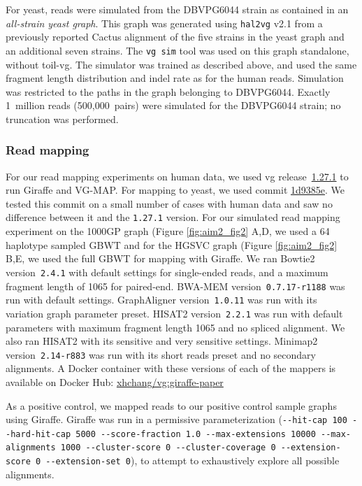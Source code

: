 \documentclass[11pt]{ucscthesis}
\newcommand{\vgcommit}[2]{\href{https://github.com/vgteam/vg/commit/#1}{#2}}
\newcommand{\vocab}[1]{\emph{#1}}
\begin{document}
For yeast, reads were simulated from the DBVPG6044 strain as contained in an \vocab{all-strain yeast graph}. 
This graph was generated using \texttt{hal2vg} v2.1 from a previously reported Cactus alignment of the five strains in the yeast graph and an additional seven strains\cite{hickey_vgsv_2020}.
The \texttt{vg~sim} tool was used on this graph standalone, without toil-vg.
The simulator was trained as described above, and used the same fragment length distribution and indel rate as for the human reads.
Simulation was restricted to the paths in the graph belonging to DBVPG6044.
Exactly 1~million reads (500,000~pairs) were simulated for the DBVPG6044 strain; no truncation was performed.


\subsubsection{Read mapping}
\label{subsec:aim2:readmapping}
For our read mapping experiments on human data, we used vg release~\vgcommit{6b7d2eeb618bb85c65438016a9eeccecfa0f6c82}{1.27.1} to run Giraffe and VG-MAP.
For mapping to yeast, we used commit \vgcommit{1d9385e1ca55689cd3ad251b6b2c23319d37be52}{1d9385e}.
We tested this commit on a small number of cases with human data and saw no difference between it and the \texttt{1.27.1} version.
For our simulated read mapping experiment on the 1000GP graph (Figure \ref{fig:aim2_fig2} A,D, we used a 64 haplotype sampled GBWT and for the HGSVC graph (Figure \ref{fig:aim2_fig2} B,E, we used the full GBWT for mapping with Giraffe.
We ran Bowtie2 version~\texttt{2.4.1} with default settings for single-ended reads, and a maximum fragment length of 1065 for paired-end.
BWA-MEM version~\texttt{0.7.17-r1188} was run with default settings.
GraphAligner version~\texttt{1.0.11} was run with its variation graph parameter preset.
HISAT2 version~\texttt{2.2.1} was run with default parameters with maximum fragment length 1065 and no spliced alignment.
We also ran HISAT2 with its sensitive and very sensitive settings.
Minimap2 version~\texttt{2.14-r883} was run with its short reads preset and no secondary alignments.
A Docker container with these versions of each of the mappers is available on Docker Hub: \href{https://hub.docker.com/layers/xhchang/vg/giraffe-paper/images/sha256-7dd5579b6cd3805c7d335803f2f646eada09f32159d1c534ab6c91c402627e33?context=explore}{xhchang/vg:giraffe-paper}

As a positive control, we mapped reads to our positive control sample graphs using Giraffe.
Giraffe was run in a permissive parameterization (\texttt{-{}-hit-cap 100 -{}-hard-hit-cap 5000 -{}-score-fraction 1.0 -{}-max-extensions 10000 -{}-max-alignments 1000 -{}-cluster-score 0 -{}-cluster-coverage 0 -{}-extension-score 0 -{}-extension-set 0}), to attempt to exhaustively explore all possible alignments.
\end{document}

